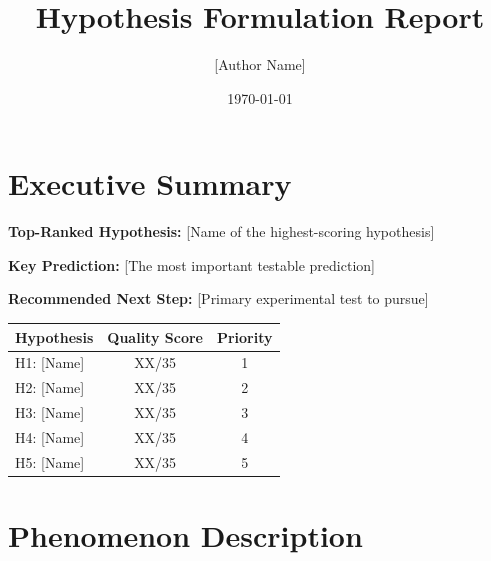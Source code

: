 \documentclass[11pt,a4paper]{article}
\title{\vspace{-1em}\textbf{Hypothesis Formulation Report}\vspace{-0.5em}}
\author{[Author Name]}
\date{\today}
\begin{document}
\maketitle
\vspace{-1em}

\section*{Executive Summary}

\begin{findingbox}
\end{findingbox}

\vspace{0.5em}
\textbf{Top-Ranked Hypothesis:} [Name of the highest-scoring hypothesis]

\textbf{Key Prediction:} [The most important testable prediction]

\textbf{Recommended Next Step:} [Primary experimental test to pursue]

\vspace{0.5em}
\begin{center}
\begin{tabular}{lcc}
\toprule
\textbf{Hypothesis} & \textbf{Quality Score} & \textbf{Priority} \\
\midrule
H1: [Name] & XX/35 & 1 \\
H2: [Name] & XX/35 & 2 \\
H3: [Name] & XX/35 & 3 \\
H4: [Name] & XX/35 & 4 \\
H5: [Name] & XX/35 & 5 \\
\bottomrule
\end{tabular}
\end{center}

\newpage

\section{Phenomenon Description}
\end{document}
